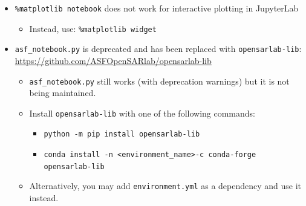 \begin{itemize}
\item \texttt{\%matplotlib notebook} does not work for interactive plotting in JupyterLab\begin{itemize}
\item Instead, use: \texttt{\%matplotlib widget}
\end{itemize}


\item \texttt{asf\_notebook.py} is deprecated and has been replaced with \texttt{opensarlab-lib}: \href{https://github.com/ASFOpenSARlab/opensarlab-lib}{https://github.com/ASFOpenSARlab/opensarlab-lib}\begin{itemize}
\item \texttt{asf\_notebook.py} still works (with deprecation warnings) but it is not being maintained.
\item Install \texttt{opensarlab-lib} with one of the following commands:\begin{itemize}
\item \texttt{python -m pip install opensarlab-lib}
\item \texttt{conda install -n \textless environment\_name\textgreater  -c conda-forge opensarlab-lib}
\end{itemize}


\item Alternatively, you may add \texttt{environment.yml} as a dependency and use it instead.
\end{itemize}
\end{itemize}
